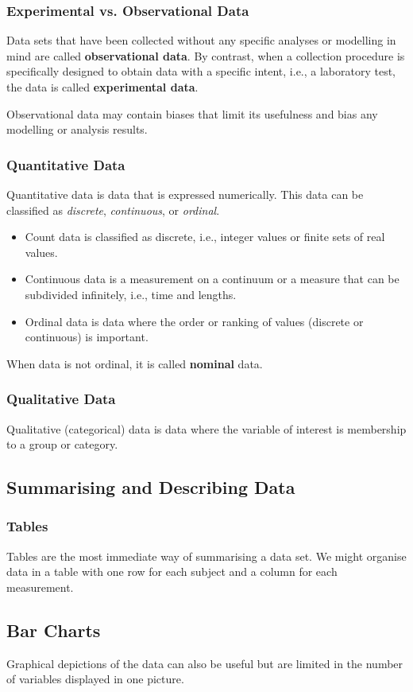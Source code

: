 \documentclass{article}
\begin{document}
\subsubsection{Experimental vs. Observational Data}
Data sets that have been collected without any specific analyses or modelling in mind are called \textbf{observational data}.
By contrast, when a collection procedure is specifically designed to obtain data with a specific intent,
i.e., a laboratory test, the data is called \textbf{experimental data}.

Observational data may contain biases that limit its usefulness and bias any modelling or analysis results.
\subsubsection{Quantitative Data}
Quantitative data is data that is expressed numerically.
This data can be classified as \textit{discrete}, \textit{continuous}, or \textit{ordinal}.
\begin{itemize}
    \item Count data is classified as discrete, i.e., integer values or finite sets
          of real values.
    \item Continuous data is a measurement on a continuum or a measure that can be subdivided infinitely,
          i.e., time and lengths.
    \item Ordinal data is data where the order or ranking of values (discrete or continuous) is important.
\end{itemize}
When data is not ordinal, it is called \textbf{nominal} data.
\subsubsection{Qualitative Data}
Qualitative (categorical) data is data where the variable of interest is
membership to a group or category.
\subsection{Summarising and Describing Data}
\subsubsection{Tables}
Tables are the most immediate way of summarising a data set.
We might organise data in a table with one row for each subject and a column for each measurement.
\subsection{Bar Charts}
Graphical depictions of the data can also be useful but are limited in the number of variables displayed in one picture.
\end{document}
